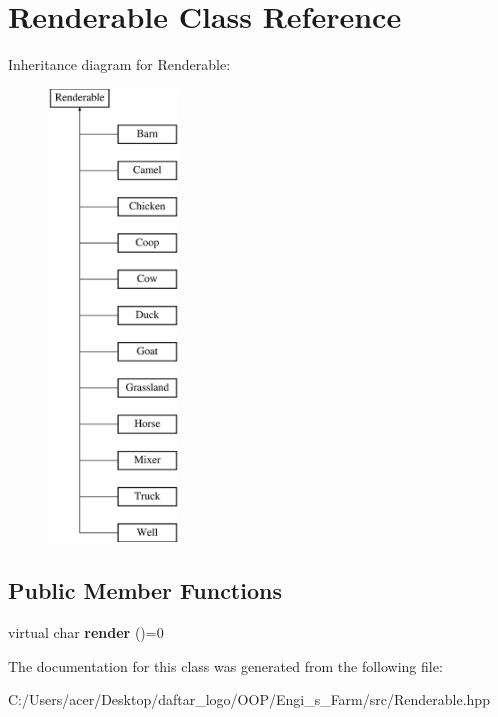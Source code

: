 \hypertarget{class_renderable}{}\section{Renderable Class Reference}
\label{class_renderable}
Inheritance diagram for Renderable\+:\begin{figure}[H]
\begin{center}
\leavevmode
\includegraphics[height=12.000000cm]{class_renderable}
\end{center}
\end{figure}
\subsection*{Public Member Functions}
\begin{DoxyCompactItemize}
\item 
\mbox{\label{class_renderable_aafa9280e6dcfa557b3cd675221fd97b4}} 
virtual char {\bfseries render} ()=0
\end{DoxyCompactItemize}


The documentation for this class was generated from the following file\+:\begin{DoxyCompactItemize}
\item 
C\+:/\+Users/acer/\+Desktop/daftar\+\_\+logo/\+O\+O\+P/\+Engi\+\_\+s\+\_\+\+Farm/src/Renderable.\+hpp\end{DoxyCompactItemize}
